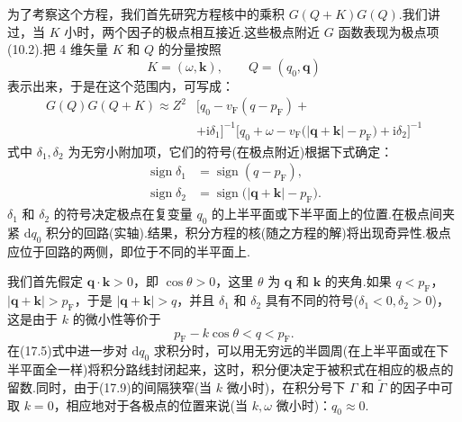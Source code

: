 为了考察这个方程，我们首先研究方程核中的乘积 $G(Q+K)G(Q)$.我们讲过，当 $K$ 小时，两个因子的极点相互接近.这些极点附近 $G$ 函数表现为极点项(10.2).把 4 维矢量 $K$ 和 $Q$ 的分量按照
\begin{equation}
  K=(\omega,\bm{k}),\qquad Q=(q_0,\bm{q})
\end{equation}
表示出来，于是在这个范围内，可写成：
\begin{equation}
\begin{aligned}
  G(Q)G(Q+K)\approx Z^2&\bigl[q_0-v_{\mathrm{F}}(q-p_{\mathrm{F}})+\\
  &+\mathrm{i}\delta_1\bigr]^{-1}\bigl[q_0+\omega-v_{\mathrm{F}}\bigl(|\bm{q}+\bm{k}|-p_{\mathrm{F}}\bigr)+\mathrm{i}\delta_2\bigr]^{-1}
\end{aligned}
\end{equation}
式中 $\delta_1,\delta_2$ 为无穷小附加项，它们的符号(在极点附近)根据下式确定：
\begin{equation}
\begin{aligned}
  \operatorname{sign}\delta_1&=\operatorname{sign}(q-p_{\mathrm{F}}),\\
  \operatorname{sign}\delta_2&=\operatorname{sign}\bigl(|\bm{q}+\bm{k}|-p_{\mathrm{F}}\bigr).
\end{aligned}
\end{equation}
$\delta_1$ 和 $\delta_2$ 的符号决定极点在复变量 $q_0$ 的上半平面或下半平面上的位置.在极点间夹紧 $\mathrm{d}q_0$ 积分的回路(实轴).结果，积分方程的核(随之方程的解)将出现奇异性.极点应位于回路的两侧，即位于不同的半平面上.

我们首先假定 $\bm{q}\cdot\bm{k}>0$，即 $\cos\theta>0$，这里 $\theta$ 为 $\bm q$ 和 $\bm k$ 的夹角.如果 $q<p_{\mathrm{F}}$，$|\bm{q}+\bm{k}|>p_{\mathrm{F}}$，于是 $|\bm{q}+\bm{k}|>q$，并且 $\delta_1$ 和 $\delta_2$ 具有不同的符号($\delta_1<0,\delta_2>0$)，这是由于 $k$ 的微小性等价于
\begin{equation}
  p_{\mathrm{F}}-k\cos\theta<q<p_{\mathrm{F}}.
\end{equation}
在(17.5)式中进一步对 $\mathrm{d}q_0$ 求积分时，可以用无穷远的半圆周(在上半平面或在下半平面全一样)将积分路线封闭起来，这时，积分便决定于被积式在相应的极点的留数.同时，由于(17.9)的间隔狭窄(当 $k$ 微小时)，在积分号下 $\Gamma$ 和 $\tilde{\Gamma}$ 的因子中可取 $k=0$，相应地对于各极点的位置来说(当 $k,\omega$ 微小时)：$q_0\approx0$.

